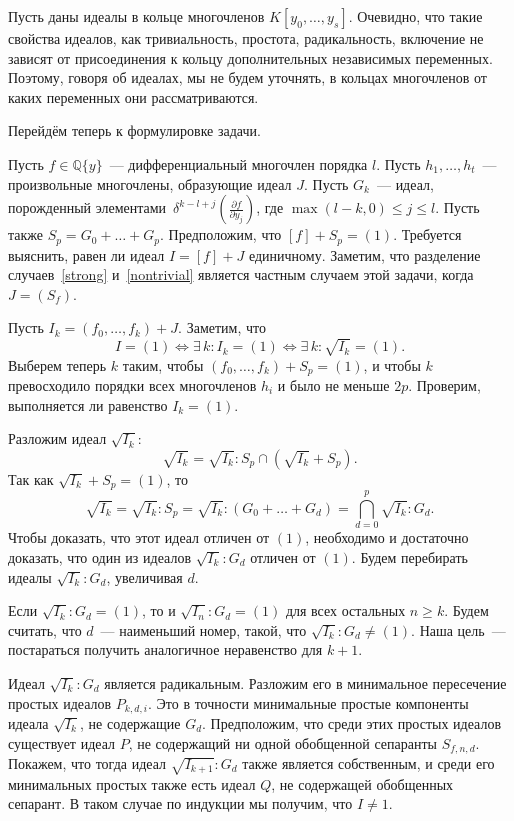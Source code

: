 \documentclass[11pt]{article}
\renewcommand{\le}{\leqslant}
\renewcommand{\ge}{\geqslant}
\theoremstyle{plain1}
\theoremstyle{plain2}
\theoremstyle{plain}
\theoremstyle{plain3}
\theoremstyle{definition}
\theoremstyle{remark}
\begin{document}
\bigskip

Пусть даны идеалы в кольце многочленов $K[y_0, \ldots, y_s]$.
Очевидно, что такие свойства идеалов, как тривиальность, простота, радикальность, включение
не зависят от присоединения к кольцу дополнительных независимых переменных.
Поэтому, говоря об идеалах, мы не будем уточнять, в кольцах многочленов от каких переменных они рассматриваются.


\bigskip

Перейдём теперь к формулировке задачи.

Пусть $f \in \mathbb{Q}\{y\}$~--- дифференциальный многочлен порядка $l$.
Пусть $h_1, \ldots, h_t$~--- произвольные многочлены, образующие идеал $J$.
Пусть $G_k$~--- идеал, порожденный элементами $\,\delta^{k-l+j} \left(\frac{\partial f}{\partial y_j}\right)$, где $\max(l-k, 0) \le j \le l$.
Пусть также $S_p = G_0 + \ldots + G_p$.
Предположим, что $[f] + S_p = (1)$.
Требуется выяснить, равен ли идеал $I = [f] + J$ единичному.
Заметим, что разделение случаев~\eqref{strong} и~\eqref{nontrivial} является частным случаем этой задачи, когда $J = (S_f)$.

\bigskip


Пусть $I_k = (f_0, \ldots, f_k) + J$. Заметим, что 
$$
 I = (1) \iff \exists \, k: I_k = (1) \iff \exists \, k: \sqrt{I_k} = (1).
$$
Выберем теперь $k$ таким, чтобы $(f_0, \ldots, f_k) + S_p = (1)$, и чтобы $k$ превосходило порядки всех многочленов $h_i$
и было не меньше $2p$.
Проверим, выполняется ли равенство $I_k = (1)$.

Разложим идеал $\sqrt{I_k}$:
$$
 \sqrt{I_k} = \sqrt{I_k} : S_p  \cap  \left(\sqrt{I_k} + S_p\right).
$$
Так как $\sqrt{I_k} + S_p = (1)$, то
$$
 \sqrt{I_k} = \sqrt{I_k} : S_p = \sqrt{I_k} : (G_0 + \ldots + G_d) = \bigcap\limits_{d = 0}^p \sqrt{I_k} : G_d.
$$
Чтобы доказать, что этот идеал отличен от $(1)$, необходимо и достаточно доказать, что один из идеалов $\sqrt{I_k}:G_d$ отличен от $(1)$.
Будем перебирать идеалы $\sqrt{I_k} : G_d$, увеличивая $d$.

Если $\sqrt{I_k} : G_d = (1)$, то и $\sqrt{I_n} : G_d = (1)$ для всех остальных $n \ge k$.
Будем считать, что $d$~--- наименьший номер, такой, что $\sqrt{I_k} : G_d \ne (1)$.
Наша цель~--- постараться получить аналогичное неравенство для $k+1$.

Идеал $\sqrt{I_k} : G_d$ является радикальным. Разложим его в минимальное пересечение простых идеалов $P_{k,d,i}$.
Это в точности минимальные простые компоненты идеала $\sqrt{I_k}$, не содержащие $G_d$.
Предположим, что среди этих простых идеалов существует идеал $P$, не содержащий ни одной обобщенной сепаранты $S_{f,n,d}$.
Покажем, что тогда идеал $\sqrt{I_{k+1}}:G_d$ также является собственным, и среди его минимальных простых также есть идеал $Q$,
не содержащей обобщенных сепарант. В таком случае по индукции мы получим, что $I \ne 1$.
\end{document}
